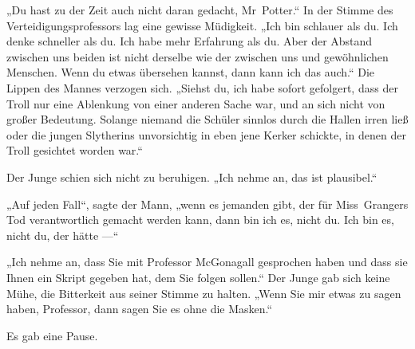 „Du hast zu der Zeit auch nicht daran gedacht, Mr~Potter.“
In der Stimme des Verteidigungsprofessors lag eine gewisse Müdigkeit.
„Ich bin schlauer als du. Ich denke schneller als du. Ich habe mehr Erfahrung als du. Aber der Abstand zwischen uns beiden ist nicht derselbe wie der zwischen uns und gewöhnlichen Menschen. Wenn du etwas übersehen kannst, dann kann ich das auch.“ Die Lippen des Mannes verzogen sich.
„Siehst du, ich habe sofort gefolgert, dass der Troll nur eine Ablenkung von einer anderen Sache war, und an sich nicht von großer Bedeutung. Solange niemand die Schüler sinnlos durch die Hallen irren ließ oder die jungen Slytherins unvorsichtig in eben jene Kerker schickte, in denen der Troll gesichtet worden war.“

Der Junge schien sich nicht zu beruhigen.
„Ich nehme an, das ist plausibel.“

„Auf jeden Fall“, sagte der Mann, „wenn es jemanden gibt, der für Miss~Grangers Tod verantwortlich gemacht werden kann, dann bin ich es, nicht du. Ich bin es, nicht du, der hätte —“

„Ich nehme an, dass Sie mit Professor McGonagall gesprochen haben und dass sie Ihnen ein Skript gegeben hat, dem Sie folgen sollen.“ Der Junge gab sich keine Mühe, die Bitterkeit aus seiner Stimme zu halten.
„Wenn Sie mir etwas zu sagen haben, Professor, dann sagen Sie es ohne die Masken.“

Es gab eine Pause.

